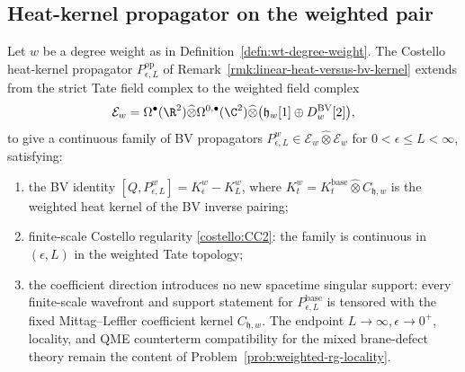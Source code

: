 \subsection*{Heat-kernel propagator on the weighted pair}

\begin{prop}\label{prop:wt-propagator-extends}
  Let $w$ be a degree weight as in
  Definition~\ref{defn:wt-degree-weight}. The Costello heat-kernel
  propagator $P_{\epsilon,L}^{\mathrm{op}}$ of
  Remark~\ref{rmk:linear-heat-versus-bv-kernel} extends from the
  strict Tate field complex to the weighted field complex
  \begin{equation}\label{eq:wt-field-complex}
    \mathcal E_w=\Omega^\bullet(\R^2)\widehat\otimes
      \Omega^{0,\bullet}(\C^2)\widehat\otimes
      \bigl(\mathfrak h_w[1]\oplus
      D^{\mathrm{BV}}_w[2]\bigr),
  \end{equation}
  to give a continuous family of BV propagators
  $P_{\epsilon,L}^{w}\in\mathcal E_w\widehat\otimes\mathcal E_w$ for
  $0<\epsilon\leq L<\infty$, satisfying:
  \begin{enumerate}[label=(\arabic*)]
    \item the BV identity
      $[Q,P_{\epsilon,L}^{w}]=K_\epsilon^{w}-K_L^{w}$, where
      $K_t^{w}=K_t^{\mathrm{base}}\widehat\otimes C_{\mathfrak h,w}$
      is the weighted heat kernel of the BV inverse pairing;
    \item finite-scale Costello regularity \ref{costello:CC2}: the family is
      continuous in $(\epsilon,L)$ in the weighted Tate topology;
    \item the coefficient direction introduces no new spacetime singular
      support: every finite-scale wavefront and support statement for
      \(P_{\epsilon,L}^{\mathrm{base}}\) is tensored with the fixed
      Mittag--Leffler coefficient kernel \(C_{\mathfrak h,w}\).  The
      endpoint \(L\to\infty,\epsilon\to0^+\), locality, and QME
      counterterm compatibility for the mixed brane-defect theory remain
      the content of Problem~\ref{prob:weighted-rg-locality}.
  \end{enumerate}
\end{prop}

